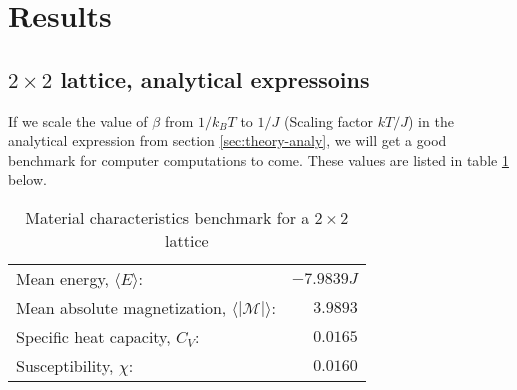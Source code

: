 \documentclass[../main.tex]{subfiles}
\begin{document}
\section{Results}
\subsection{$2 \times 2$ lattice, analytical expressoins}
If we scale the value of $\beta$ from $1/k_BT$ to $1/J$ (Scaling factor $kT/J$) in the analytical expression from section \ref{sec:theory-analy}, we will get a good benchmark for computer computations to come. These values are listed in table \ref{tab:2x2spinsEnergiesMags} below.
\begin{table}[!h]
\begin{center}
  \begin{tabular}{l r}
    Mean energy, $\langle E \rangle$: & $-7.9839J$  \\
    Mean absolute magnetization, $\langle |\mathcal{M}| \rangle$: & $3.9893$ \\
    Specific heat capacity, $C_V$: & $0.0165$\\
    Susceptibility, $\chi$: & $0.0160$
  \end{tabular}
  \caption{Material characteristics benchmark for a $2 \times 2$ lattice}
  \label{tab:2x2spinsEnergiesMags}
\end{center}
\end{table}
\FloatBarrier
\end{document}
